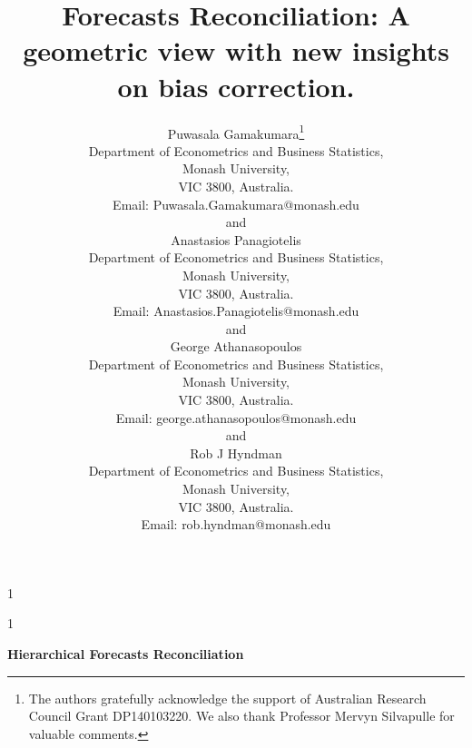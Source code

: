 \documentclass[12pt]{article}
\newcommand{\blind}{1}
\theoremstyle{definition}
\theoremstyle{property}
\begin{document}
	
	
	
	\def\spacingset#1{\renewcommand{\baselinestretch}%
		{#1}\small\normalsize} \spacingset{1}
	
	
	
	\blind
	{
		\title{\bf Forecasts Reconciliation: A geometric view with new insights on bias correction.}
		\author{Puwasala Gamakumara\thanks{
				The authors gratefully acknowledge the support of Australian Research Council Grant DP140103220.  We also thank Professor Mervyn Silvapulle for valuable comments.}\hspace{.2cm}\\
			Department of Econometrics and Business Statistics,\\
			Monash University,\\ VIC 3800, Australia.\\
			Email: Puwasala.Gamakumara@monash.edu \\
			and \\
			Anastasios Panagiotelis\\
			Department of Econometrics and Business Statistics,\\
			Monash University,\\ VIC 3800, Australia.\\
			Email: Anastasios.Panagiotelis@monash.edu \\
			and \\
			George Athanasopoulos\\
			Department of Econometrics and Business Statistics,\\
			Monash University,\\ VIC 3800, Australia.\\
			Email: george.athanasopoulos@monash.edu \\
			and \\
			Rob J Hyndman\\
			Department of Econometrics and Business Statistics,\\
			Monash University,\\ VIC 3800, Australia.\\
			Email: rob.hyndman@monash.edu \\}
		\maketitle
	} \fi
	
	\blind
	{
		\bigskip
		\bigskip
		\bigskip
		\begin{center}
			{\LARGE\bf Hierarchical Forecasts Reconciliation}
		\end{center}
		\medskip
	} \fi
	
\end{document}
